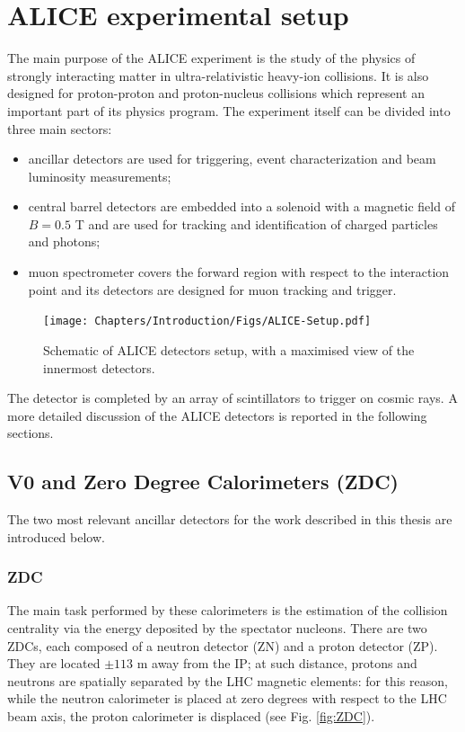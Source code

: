 \section{ALICE experimental setup} %
\label{ALICE_apparatus}
The main purpose of the ALICE experiment is the study of the physics of strongly interacting matter in ultra-relativistic heavy-ion collisions. It is also designed for proton-proton and proton-nucleus collisions which represent an important part of its physics program. The experiment itself can be divided into three main sectors:
\begin{itemize}
    \item ancillar detectors are used for triggering, event characterization and beam luminosity measurements;
    \item central barrel detectors are embedded into a solenoid with a magnetic field of $B = 0.5$ T and are used for tracking and identification of charged particles and photons;
    \item muon spectrometer covers the forward region with respect to the interaction point and its detectors are designed for muon tracking and trigger.
\end{itemize}

\begin{figure}[!h]
\begin{center}
\texttt{[image: Chapters/Introduction/Figs/ALICE-Setup.pdf]}
\caption{Schematic of ALICE detectors setup, with a maximised view of the innermost detectors.}
\label{fig:ALICEsetup}
\end{center}
\end{figure}

The detector is completed by an array of scintillators to trigger on cosmic rays.
A more detailed discussion of the ALICE detectors is reported in the following sections.

\subsection{V0 and Zero Degree Calorimeters (ZDC)}
The two most relevant ancillar detectors for the work described in this thesis are introduced below.

\subsubsection{ZDC}
The main task performed by these calorimeters is the estimation of the collision centrality via the energy deposited by the spectator nucleons. 
There are two ZDCs, each composed of a neutron detector (ZN) and a proton detector (ZP).
They are located $\pm113$ m away from the IP; at such distance, protons and neutrons are spatially separated by the LHC magnetic elements: for this reason, while the neutron calorimeter is placed at zero degrees with respect to the LHC beam axis, the proton calorimeter is displaced (see Fig. \ref{fig:ZDC}).

